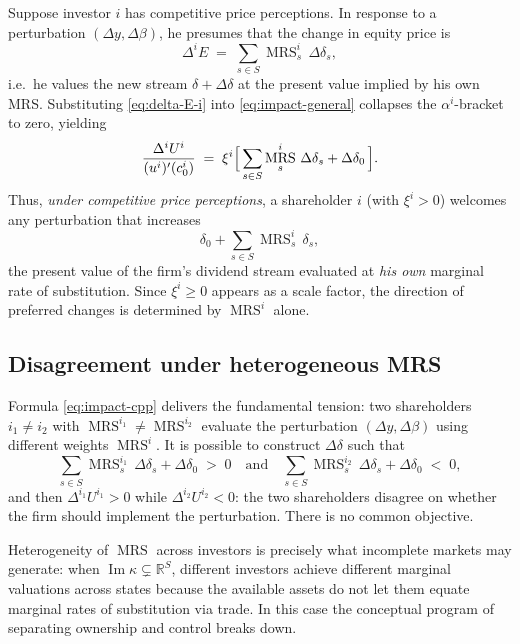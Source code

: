 \documentclass[11pt,a4paper]{article}
\def\R{\mathbb{R}}
\def\geq{\geqslant}
\def\et{\quad \text{and} \quad}
\DeclareMathOperator{\MRS}{MRS}
\DeclareMathOperator{\Range}{Im}
\theoremstyle{plain}
\theoremstyle{definition}
\theoremstyle{remark}
\begin{document}
Suppose investor $i$ has competitive price perceptions. In response to a perturbation $(\Delta y,\Delta\beta)$, he presumes that the change in equity price is
\begin{equation}\label{eq:delta-E-i}
  \Delta^i E \;=\; \sum_{s\in S}\MRS^i_s\,\Delta\delta_s,
\end{equation}
i.e.\ he values the new stream $\delta + \Delta\delta$ at the present value implied by his own MRS. Substituting \eqref{eq:delta-E-i} into \eqref{eq:impact-general} collapses the $\alpha^i$-bracket to zero, yielding
\begin{equation}\label{eq:impact-cpp}
  \frac{\Delta^i U^i}{(u^i)'(c^i_0)}
  \;=\; \xi^i\Bigl[\,\sum_{s\in S}\MRS^i_s\,\Delta\delta_s + \Delta\delta_0\,\Bigr].
\end{equation}
Thus, \emph{under competitive price perceptions}, a shareholder $i$ (with $\xi^i>0$) welcomes any perturbation that increases
\[
  \delta_0 + \sum_{s\in S}\MRS^i_s\,\delta_s,
\]
the present value of the firm's dividend stream evaluated at \emph{his own} marginal rate of substitution. Since $\xi^i\geq 0$ appears as a scale factor, the direction of preferred changes is determined by $\MRS^i$ alone.

\subsection{Disagreement under heterogeneous MRS}

Formula \eqref{eq:impact-cpp} delivers the fundamental tension: two shareholders $i_1\neq i_2$ with $\MRS^{i_1}\neq \MRS^{i_2}$ evaluate the perturbation $(\Delta y,\Delta\beta)$ using different weights $\MRS^{i}$. It is possible to construct $\Delta\delta$ such that
\[
  \sum_{s\in S}\MRS^{i_1}_s\,\Delta\delta_s + \Delta\delta_0 \;>\; 0
  \et
  \sum_{s\in S}\MRS^{i_2}_s\,\Delta\delta_s + \Delta\delta_0 \;<\; 0,
\]
and then $\Delta^{i_1}U^{i_1}>0$ while $\Delta^{i_2}U^{i_2}<0$: the two shareholders disagree on whether the firm should implement the perturbation. There is no common objective.

Heterogeneity of $\MRS$ across investors is precisely what incomplete markets may generate: when $\Range\kappa\subsetneq \R^S$, different investors achieve different marginal valuations across states because the available assets do not let them equate marginal rates of substitution via trade. In this case the conceptual program of separating ownership and control breaks down.

\end{document}
